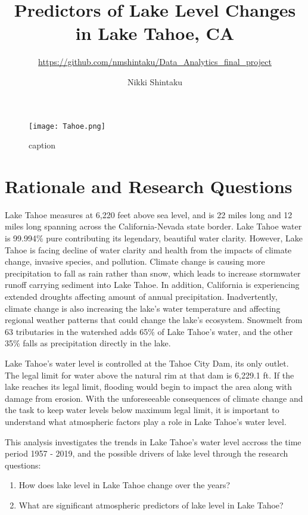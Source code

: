 \documentclass[12pt,]{article}
\title{Predictors of Lake Level Changes in Lake Tahoe, CA}
\subtitle{\url{https://github.com/nmshintaku/Data_Analytics_final_project}}
\author{Nikki Shintaku}
\date{}
\begin{document}
\maketitle

\newpage
\tableofcontents 
\newpage
\listoftables 
\newpage
\listoffigures 
\newpage

\begin{figure}
\centering
\texttt{[image: Tahoe.png]}
\caption{caption}
\end{figure}

\hypertarget{rationale-and-research-questions}{%
\section{Rationale and Research
Questions}\label{rationale-and-research-questions}}

Lake Tahoe measures at 6,220 feet above sea level, and is 22 miles long
and 12 miles long spanning across the California-Nevada state border.
Lake Tahoe water is 99.994\% pure contributing its legendary, beautiful
water clarity. However, Lake Tahoe is facing decline of water clarity
and health from the impacts of climate change, invasive species, and
pollution. Climate change is causing more precipitation to fall as rain
rather than snow, which leads to increase stormwater runoff carrying
sediment into Lake Tahoe. In addition, California is experiencing
extended droughts affecting amount of annual precipitation.
Inadvertently, climate change is also increasing the lake's water
temperature and affecting regional weather patterns that could change
the lake's ecosystem. Snowmelt from 63 tributaries in the watershed adds
65\% of Lake Tahoe's water, and the other 35\% falls as precipitation
directly in the lake.

Lake Tahoe's water level is controlled at the Tahoe City Dam, its only
outlet. The legal limit for water above the natural rim at that dam is
6,229.1 ft. If the lake reaches its legal limit, flooding would begin to
impact the area along with damage from erosion. With the unforeseeable
consequences of climate change and the task to keep water levels below
maximum legal limit, it is important to understand what atmospheric
factors play a role in Lake Tahoe's water level.

This analysis investigates the trends in Lake Tahoe's water level
accross the time period 1957 - 2019, and the possible drivers of lake
level through the research questions:

\begin{enumerate}
\def\labelenumi{\arabic{enumi}.}
\item
  How does lake level in Lake Tahoe change over the years?
\item
  What are significant atmospheric predictors of lake level in Lake
  Tahoe?
\end{enumerate}
\end{document}

